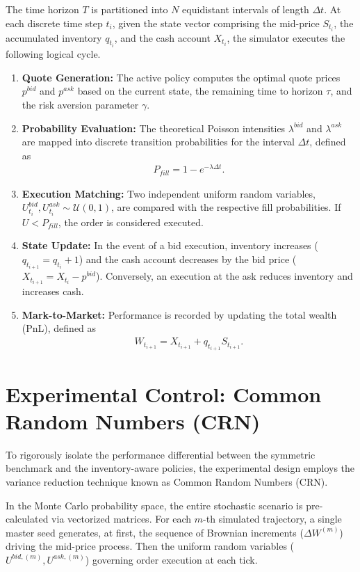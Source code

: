 \documentclass[a4paper,10pt,titlepage,oneside,openany]{book}
\theoremstyle{plain}\newtheorem{theorem}{Theorem}[chapter]
\theoremstyle{definition}\newtheorem{definition}{Definition}[chapter]
\theoremstyle{remark}\newtheorem{remark}{Remark}[chapter]
\begin{document}
The time horizon $T$ is partitioned into $N$ equidistant intervals of length $\Delta t$. At each discrete time step $t_i$, given the state vector comprising the mid-price $S_{t_i}$, the accumulated inventory $q_{t_i}$, and the cash account $X_{t_i}$, the simulator executes the following logical cycle.

\begin{enumerate}
    \item \textbf{Quote Generation:} The active policy computes the optimal quote prices $p^{bid}$ and $p^{ask}$ based on the current state, the remaining time to horizon $\tau$, and the risk aversion parameter $\gamma$.
    \item \textbf{Probability Evaluation:} The theoretical Poisson intensities $\lambda^{bid}$ and $\lambda^{ask}$ are mapped into discrete transition probabilities for the interval $\Delta t$, defined as
    \begin{align*}
        P_{fill} = 1 - e^{-\lambda \Delta t}.
    \end{align*}
    \item \textbf{Execution Matching:} Two independent uniform random variables, $U^{bid}_{t_i}, U^{ask}_{t_i} \sim \mathcal{U}(0,1)$, are compared with the respective fill probabilities. If $U < P_{fill}$, the order is considered executed.
    \item \textbf{State Update:} In the event of a bid execution, inventory increases ($q_{t_{i+1}} = q_{t_i} + 1$) and the cash account decreases by the bid price ($X_{t_{i+1}} = X_{t_i} - p^{bid}$). Conversely, an execution at the ask reduces inventory and increases cash.
    \item \textbf{Mark-to-Market:} Performance is recorded by updating the total wealth (PnL), defined as
    \begin{align*}
        W_{t_{i+1}} = X_{t_{i+1}} + q_{t_{i+1}} S_{t_{i+1}}.
    \end{align*}
\end{enumerate}

\section{Experimental Control: Common Random Numbers (CRN)}
To rigorously isolate the performance differential between the symmetric benchmark and the inventory-aware policies, the experimental design employs the variance reduction technique known as Common Random Numbers (CRN).

In the Monte Carlo probability space, the entire stochastic scenario is pre-calculated via vectorized matrices. For each $m$-th simulated trajectory, a single master seed generates, at first, the sequence of Brownian increments ($\Delta W^{(m)}$) driving the mid-price process. Then the uniform random variables ($U^{bid, (m)}, U^{ask, (m)}$) governing order execution at each tick.
\end{document}
